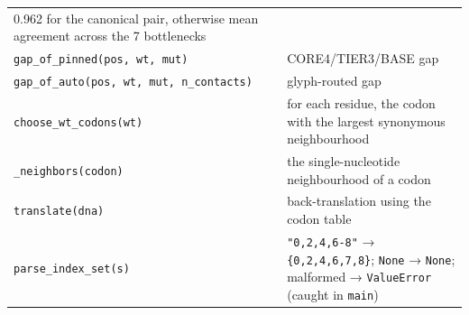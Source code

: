 \documentclass[12pt,a4paper]{article}
\begin{document}
\begin{longtable}[]{@{}ll@{}}
\begin{minipage}[t]{0.47\columnwidth}
0.962 for the canonical pair, otherwise mean agreement across the 7
bottlenecks\strut
\end{minipage}\tabularnewline
\begin{minipage}[t]{0.47\columnwidth}\raggedright
\texttt{gap\_of\_pinned(pos,\ wt,\ mut)}\strut
\end{minipage} & \begin{minipage}[t]{0.47\columnwidth}\raggedright
CORE4/TIER3/BASE gap\strut
\end{minipage}\tabularnewline
\begin{minipage}[t]{0.47\columnwidth}\raggedright
\texttt{gap\_of\_auto(pos,\ wt,\ mut,\ n\_contacts)}\strut
\end{minipage} & \begin{minipage}[t]{0.47\columnwidth}\raggedright
glyph-routed gap\strut
\end{minipage}\tabularnewline
\begin{minipage}[t]{0.47\columnwidth}\raggedright
\texttt{choose\_wt\_codons(wt)}\strut
\end{minipage} & \begin{minipage}[t]{0.47\columnwidth}\raggedright
for each residue, the codon with the largest synonymous
neighbourhood\strut
\end{minipage}\tabularnewline
\begin{minipage}[t]{0.47\columnwidth}\raggedright
\texttt{\_neighbors(codon)}\strut
\end{minipage} & \begin{minipage}[t]{0.47\columnwidth}\raggedright
the single-nucleotide neighbourhood of a codon\strut
\end{minipage}\tabularnewline
\begin{minipage}[t]{0.47\columnwidth}\raggedright
\texttt{translate(dna)}\strut
\end{minipage} & \begin{minipage}[t]{0.47\columnwidth}\raggedright
back-translation using the codon table\strut
\end{minipage}\tabularnewline
\begin{minipage}[t]{0.47\columnwidth}\raggedright
\texttt{parse\_index\_set(s)}\strut
\end{minipage} & \begin{minipage}[t]{0.47\columnwidth}\raggedright
\texttt{"0,2,4,6-8"} → \texttt{\{0,2,4,6,7,8\}}; \texttt{None} →
\texttt{None}; malformed → \texttt{ValueError} (caught in
\texttt{main})\strut
\end{minipage}\tabularnewline

\end{longtable}
\end{document}
